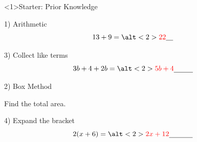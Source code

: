 \documentclass{beamer}
\newcommand{\ablank}[1]{%
  \alt<2>{\textcolor{red}{#1}}{\underline{\phantom{#1}}}%
}
\newcommand{\ashow}[1]{\uncover<2->{\textcolor{red}{\small #1}}}
\newcommand{\ashowq}[1]{\alt<2->{\textcolor{red}{\small #1}}{?}}
\begin{document}
\begin{frame}<1>{Starter: Prior Knowledge}
\begin{minipage}[t]{0.48\textwidth}

\begin{block}{1) Arithmetic}
\Large
\[
13 + 9 = \ablank{22}
\]
\end{block}

\vspace{6.2em}

\begin{block}{3) Collect like terms}
\Large
\[
3b + 4 + 2b = \ablank{5b+4}
\]
\end{block}

\end{minipage}\hfill
\begin{minipage}[t]{0.48\textwidth}

\begin{block}{2) Box Method}
\centering
{}

\vspace{0.4em}
Find the total area. \ashow{Total area $= 32$}

\end{block}

\vspace{0.6em}

\begin{block}{4) Expand the bracket}
\Large
\[
2(x+6) = \ablank{2x+12}
\]
\end{block}

\end{minipage}
\end{frame}
\end{document}
